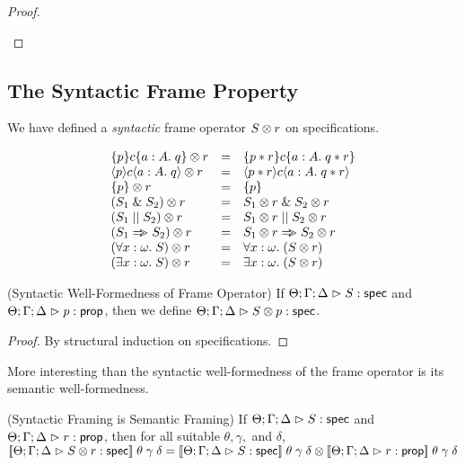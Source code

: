 \begin{proof}
\begin{tabbedproof}
\end{tabbedproof}
\end{proof}


\subsection{The Syntactic Frame Property}

We have defined a \emph{syntactic} frame operator ${S} \otimes {r}$ on
specifications.

\begin{displaymath}
  \begin{array}{lcl}
    {\{{p}\}{c}\{{a:A}.\;{q}\}} \otimes {r}    & = & \{{p * r}\}{c}\{{a:A}.\;{q * r}\} \\
    {\langle{p}\rangle{c}\langle{a:A}.\;{q}\rangle} \otimes {r}   & = & \langle{p * r}\rangle{c}\langle{a:A}.\;{q * r}\rangle \\
    {\{{p}\}} \otimes {r}              & = & \{{p}\} \\
    {(S_1 \;\&\; S_2)} \otimes {r}      & = & {S_1} \otimes {r} \;\&\; {S_2} \otimes {r} \\
    {(S_1 \;||\; S_2)} \otimes {r}       & = & {S_1} \otimes {r} \;||\; {S_2} \otimes {r} \\
    {(S_1 \Rightarrow\!\!\!> S_2)} \otimes {r}      & = & {S_1} \otimes {r} \Rightarrow\!\!\!> {S_2} \otimes {r} \\
    {(\forall x:\omega.\; S)} \otimes {r} & = & \forall x:\omega.\; ({S} \otimes {r}) \\
    {(\exists x:\omega.\; S)} \otimes {r} & = & \exists x:\omega.\; ({S} \otimes {r}) \\
  \end{array}
\end{displaymath}

\begin{prop*}{(Syntactic Well-Formedness of Frame Operator)}
If ${\Theta; \Gamma; \Delta} \vartriangleright {S} : \mathsf{spec}$ and ${\Theta; \Gamma; \Delta} \vartriangleright {p} : {\mathsf{prop}}$, then
we define ${\Theta; \Gamma; \Delta} \vartriangleright {{S} \otimes {p}} : \mathsf{spec}$.  
\end{prop*}
\begin{proof}
  By structural induction on specifications.
\end{proof}

More interesting than the syntactic well-formedness of the frame
operator is its semantic well-formedness. 

\begin{lemma*}{(Syntactic Framing is Semantic Framing)}
If ${\Theta; \Gamma; \Delta} \vartriangleright {S} : \mathsf{spec}$ and ${\Theta; \Gamma; \Delta} \vartriangleright {r} : {\mathsf{prop}}$, then for all suitable $\theta, \gamma,$ and $\delta$, 
$[\![{{\Theta; \Gamma; \Delta} \vartriangleright {{S} \otimes {r}} : \mathsf{spec}}]\!]\;\theta\;\gamma\;\delta = 
{[\![{{\Theta; \Gamma; \Delta} \vartriangleright {S} : \mathsf{spec}}]\!]\;\theta\;\gamma\;\delta} \otimes {[\![{{\Theta; \Gamma; \Delta} \vartriangleright {r} : {\mathsf{prop}}}]\!]\;\theta\;\gamma\;\delta}$ \\
\end{lemma*}

